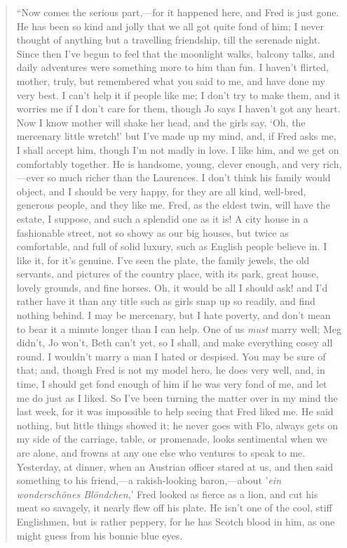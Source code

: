 \begin{quote}
``Now comes the serious part,---for it happened here, and Fred is just
gone. He has been so kind and jolly that we all got quite fond of him; I
never thought of anything but a travelling friendship, till the serenade
night. Since then I've begun to feel that the moonlight
walks, balcony talks, and daily adventures were something more to him
than fun. I haven't flirted, mother, truly, but
remembered what you said to me, and have done my very best. I
can't help it if people like me; I don't
try to make them, and it worries me if I don't care for
them, though Jo says I haven't got any heart. Now I know
mother will shake her head, and the girls say, `Oh, the
mercenary little wretch!' but I've made
up my mind, and, if Fred asks me, I shall accept him, though
I'm not madly in love. I like him, and we get on
comfortably together. He is handsome, young, clever enough, and very
rich,---ever so much richer than the Laurences. I don't
think his family would object, and I should be very happy, for they are
all kind, well-bred, generous people, and they like me. Fred, as the
eldest twin, will have the estate, I suppose, and such a splendid one as
it is! A city house in a fashionable street, not so showy as our big
houses, but twice as comfortable, and full of solid luxury, such as
English people believe in. I like it, for it's genuine.
I've seen the plate, the family jewels, the old
servants, and pictures of the country place, with its park, great house,
lovely grounds, and fine horses. Oh, it would be all I should ask! and
I'd rather have it than any title such as girls snap up
so readily, and find nothing behind. I may be mercenary, but I hate
poverty, and don't mean to bear it a minute longer than
I can help. One of us \emph{must} marry well; Meg
didn't, Jo won't, Beth
can't yet, so I shall, and make everything cosey all
round. I wouldn't marry a man I hated or despised. You
may be sure of that; and, though Fred is not my model hero, he does very
well, and, in time, I should get fond enough of him if he was very fond
of me, and let me do just as I liked. So I've been
turning the matter over in my mind the last week, for it was impossible
to help seeing that Fred liked me. He said nothing, but little things
showed it; he never goes with Flo, always gets on my side of the
carriage, table, or promenade, looks sentimental when we are alone, and
frowns at any one else who ventures to speak to me. Yesterday, at
dinner, when an Austrian officer stared at us, and then said something
to his friend,---a rakish-looking baron,---about
'\emph{ein wonderschönes Blöndchen},'
Fred looked as fierce as a lion, and cut his meat so savagely, it nearly
flew off his plate. He isn't one of the cool, stiff
Englishmen, but is rather peppery, for he has Scotch blood in him, as
one might guess from his bonnie blue eyes.


\end{quote}

